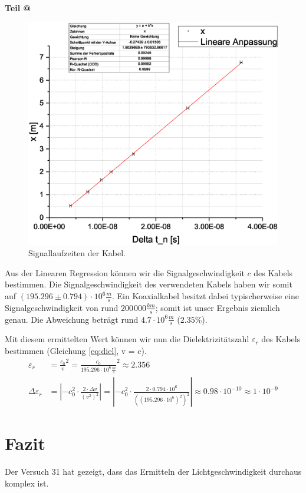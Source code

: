 \documentclass[10pt,a4paper]{article}
\makeatletter
\newcommand*{\rom}[1]{\expandafter\@slowromancap\romannumeral #1@}
\newcommand{\vnr}{31}
\makeatother
\begin{document}
\begin{flushleft}
\textbf{Teil \rom{2}}
\begin{figure}[H]
\centering
\includegraphics[scale=0.45]{Kabel}
\caption{Signallaufzeiten der Kabel.}
\label{fig:kab}
\end{figure}
Aus der Linearen Regression können wir die Signalgeschwindigkeit $c$ des Kabels bestimmen. Die Signalgeschwindigkeit des verwendeten Kabels haben wir somit auf $(195.296 \pm 0.794) \cdot 10^6 \frac{m}{s}$. Ein Koaxialkabel besitzt dabei typischerweise eine Signalgeschwindigkeit von rund $200\hspace{1pt}000 \frac{km}{s}$; somit ist unser Ergebnis ziemlich genau. Die Abweichung beträgt rund $4.7 \cdot 10^6 \frac{m}{s}$ ($2.35\%$).

Mit diesem ermittelten Wert können wir nun die Dielektrizitätszahl $\varepsilon_r$ des Kabels bestimmen (Gleichung \ref{eq:diel}, v = c).
\begin{align*}
\varepsilon_r &= \frac{c_0}{v}^2 = \frac{c_0}{195.296 \cdot 10^6 \frac{m}{s}}^2 \approx 2.356 \\
\Delta \varepsilon_r &= |- c_0^2 \cdot \frac{2 \cdot \Delta v}{(v^2)^2}| = |- c_0^2 \cdot \frac{2 \cdot 0.794 \cdot 10^6}{((195.296 \cdot 10^6)^2)^2}| \approx 0.98 \cdot 10^{-10} \approx 1 \cdot 10^{-9}
\end{align*}
\end{flushleft}

\section{Fazit}
\begin{flushleft}
Der Versuch \vnr\hspace{1pt} hat gezeigt, dass das Ermitteln der Lichtgeschwindigkeit durchaus komplex ist.
\end{flushleft}
\end{document}
